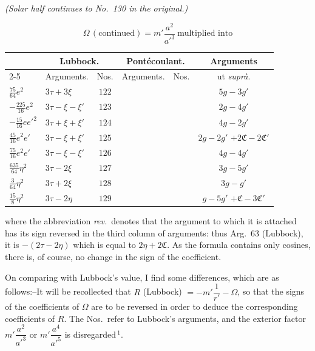 \documentclass[12pt,a4paper]{article}
\theoremstyle{plain}
\begin{document}
\medskip
\noindent\hbox{}\hfill\textit{(Solar half continues to No.~130 in the original.)}

\newpage
{}
\[
\Omega\,(\text{continued})=m'\frac{a^{2}}{a'^{3}}\ \text{multiplied into}
\]

\begin{center}
\small
\begin{tabular}{|l|l|c|c|c|c|}
\hline
& \multicolumn{2}{c|}{Lubbock.} & \multicolumn{2}{c|}{Pont\'ecoulant.} & Arguments \\
\cline{2-5}
& Arguments. & Nos. & Arguments. & Nos. & ut \textit{supr\`a}. \\
\hline
$\tfrac{75}{64}e^{2}$  & $3\tau+3\xi$       & $122$ &       &     & $5g-3g'$ \\
$-\tfrac{225}{16}e^{2}$ & $3\tau-\xi-\xi'$  & $123$ &       &     & $2g-4g'$ \\
$-\tfrac{15}{16}e e'^{2}$ & $3\tau+\xi+\xi'$ & $124$ &     &     & $4g-2g'$ \\
$\tfrac{45}{16}e^{2}e'$ & $3\tau-\xi+\xi'$  & $125$ &       &     & $2g-2g'$ \quad $+2\mathfrak{C}-2\mathfrak{C}'$ \\
$\tfrac{75}{16}e^{2}e'$ & $3\tau-\xi-\xi'$ & $126$ &     &     & $4g-4g'$ \\
$\tfrac{635}{64}\eta^{2}$ & $3\tau-2\xi$    & $127$ &      &     & $3g-5g'$ \\
$\tfrac{3}{64}\eta^{2}$  & $3\tau+2\xi$     & $128$ &      &     & $3g-g'$ \\
$\tfrac{15}{8}\eta^{2}$  & $3\tau-2\eta$    & $129$ &      &     & $g-5g'$ \quad $+\mathfrak{C}-3\mathfrak{C}'$ \\
\hline
\end{tabular}
\end{center}

\medskip

\noindent where the abbreviation \textit{rev.}\ denotes that the argument to which it is attached has its sign reversed in the third column of arguments: thus Arg.~63 (Lubbock), it is $-(2\tau-2\eta)$ which is equal to $2\eta+2\mathfrak{C}$. As the formula contains only cosines, there is, of course, no change in the sign of the coefficient.

\medskip

On comparing with Lubbock's value, I find some differences, which are as follows:--It will be recollected that $R$ (Lubbock) $=-m'\dfrac{1}{r'}-\Omega$, so that the signs of the coefficients of $\Omega$ are to be reversed in order to deduce the corresponding coefficients of $R$. The Nos.\ refer to Lubbock's arguments, and the exterior factor $m'\dfrac{a^{2}}{a'^{3}}$ or $m'\dfrac{a^{4}}{a'^{5}}$ is disregarded\,$^{1}$.
\end{document}
